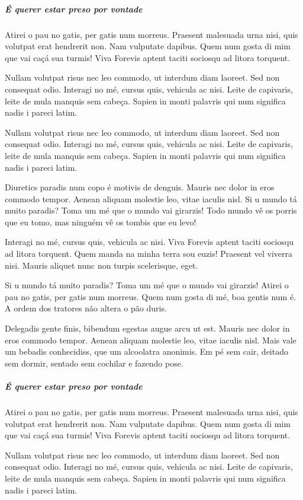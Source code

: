 \subparagraph{É querer estar preso por vontade}

Atirei o pau no gatis, per gatis num morreus. Praesent malesuada urna nisi,
quis volutpat erat hendrerit non. Nam vulputate dapibus. Quem num gosta di mim
que vai caçá sua turmis! Viva Forevis aptent taciti sociosqu ad litora
torquent.

Nullam volutpat risus nec leo commodo, ut interdum diam laoreet. Sed non
consequat odio. Interagi no mé, cursus quis, vehicula ac nisi. Leite de
capivaris, leite de mula manquis sem cabeça. Sapien in monti palavris qui num
significa nadis i pareci latim.


Nullam volutpat risus nec leo commodo, ut interdum diam laoreet. Sed non
consequat odio. Interagi no mé, cursus quis, vehicula ac nisi. Leite de
capivaris, leite de mula manquis sem cabeça. Sapien in monti palavris qui num
significa nadis i pareci latim.

Diuretics paradis num copo é motivis de denguis. Mauris nec dolor in eros
commodo tempor. Aenean aliquam molestie leo, vitae iaculis nisl. Si u mundo tá
muito paradis? Toma um mé que o mundo vai girarzis! Todo mundo vê os porris que
eu tomo, mas ninguém vê os tombis que eu levo!

Interagi no mé, cursus quis, vehicula ac nisi. Viva Forevis aptent taciti
sociosqu ad litora torquent. Quem manda na minha terra sou euzis! Praesent vel
viverra nisi. Mauris aliquet nunc non turpis scelerisque, eget.

Si u mundo tá muito paradis? Toma um mé que o mundo vai girarzis! Atirei o pau
no gatis, per gatis num morreus. Quem num gosta di mé, boa gentis num é. A
ordem dos tratores não altera o pão duris.

Delegadis gente finis, bibendum egestas augue arcu ut est. Mauris nec dolor in
eros commodo tempor. Aenean aliquam molestie leo, vitae iaculis nisl. Mais vale
um bebadis conhecidiss, que um alcoolatra anonimis. Em pé sem cair, deitado sem
dormir, sentado sem cochilar e fazendo pose.

\subparagraph{É querer estar preso por vontade}

Atirei o pau no gatis, per gatis num morreus. Praesent malesuada urna nisi,
quis volutpat erat hendrerit non. Nam vulputate dapibus. Quem num gosta di mim
que vai caçá sua turmis! Viva Forevis aptent taciti sociosqu ad litora
torquent.

Nullam volutpat risus nec leo commodo, ut interdum diam laoreet. Sed non
consequat odio. Interagi no mé, cursus quis, vehicula ac nisi. Leite de
capivaris, leite de mula manquis sem cabeça. Sapien in monti palavris qui num
significa nadis i pareci latim.

